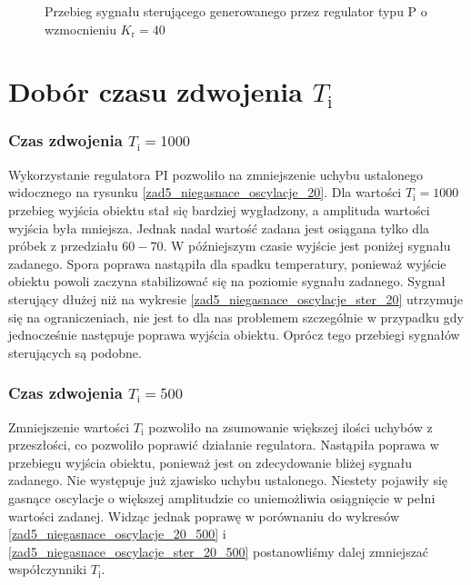 \begin{figure}[b]
    \centering
    \caption{Przebieg sygnału sterującego generowanego przez regulator typu P o wzmocnieniu $K_{\mathrm{r}} = \num{40}$}
    \label{zad5_niegasnace_oscylacje_ster_40}
\end{figure}
\FloatBarrier

\section{Dobór czasu zdwojenia $T_{\mathrm{i}}$}
\subsubsection{Czas zdwojenia $T_{\mathrm{i}} = \num{1000}$} 
Wykorzystanie regulatora PI pozwoliło na zmniejszenie uchybu ustalonego widocznego na rysunku \ref{zad5_niegasnace_oscylacje_20}. Dla wartości $T_{\mathrm{i}} = 1000$ przebieg wyjścia obiektu stał się bardziej wygładzony, a amplituda wartości wyjścia była mniejsza. Jednak nadal wartość zadana jest osiągana tylko dla próbek z przedziału $60 - 70$. W późniejszym czasie wyjście jest poniżej sygnału zadanego. Spora poprawa nastąpiła dla spadku temperatury, ponieważ wyjście obiektu powoli zaczyna stabilizować się na poziomie sygnału zadanego. Sygnał sterujący dłużej niż na wykresie \ref{zad5_niegasnace_oscylacje_ster_20} utrzymuje się na ograniczeniach, nie jest to dla nas problemem szczególnie w przypadku gdy jednocześnie następuje poprawa wyjścia obiektu. Oprócz tego przebiegi sygnałów sterujących są podobne. 

\subsubsection{Czas zdwojenia $T_{\mathrm{i}} = \num{500}$} 
Zmniejszenie wartości $T_{\mathrm{i}}$ pozwoliło na zsumowanie większej ilości uchybów z przeszłości, co pozwoliło poprawić działanie regulatora. Nastąpiła poprawa w przebiegu wyjścia obiektu, ponieważ jest on zdecydowanie bliżej sygnału zadanego. Nie występuje już zjawisko uchybu ustalonego. Niestety pojawiły się gasnące oscylacje o większej amplitudzie co uniemożliwia osiągnięcie w pełni wartości zadanej. Widząc jednak poprawę w porównaniu do wykresów \ref{zad5_niegasnace_oscylacje_20_500} i \ref{zad5_niegasnace_oscylacje_ster_20_500} postanowliśmy dalej zmniejszać współczynniki $T_{\mathrm{i}}$.

